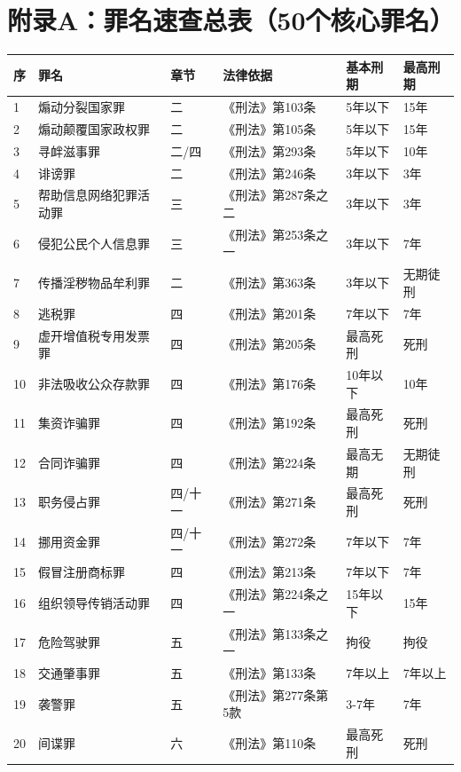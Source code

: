 \documentclass[12pt,a4paper]{article}
\begin{document}
\section{附录A：罪名速查总表（50个核心罪名）}

\begin{longtable}{p{0.5cm}p{4cm}p{2cm}p{3cm}p{2cm}p{2cm}}
  \toprule
  \textbf{序} & \textbf{罪名} & \textbf{章节} & \textbf{法律依据} & \textbf{基本刑期} & \textbf{最高刑期} \\
  \midrule
  1 & 煽动分裂国家罪 & 二 & 《刑法》第103条 & 5年以下 & 15年 \\
  2 & 煽动颠覆国家政权罪 & 二 & 《刑法》第105条 & 5年以下 & 15年 \\
  3 & 寻衅滋事罪 & 二/四 & 《刑法》第293条 & 5年以下 & 10年 \\
  4 & 诽谤罪 & 二 & 《刑法》第246条 & 3年以下 & 3年 \\
  5 & 帮助信息网络犯罪活动罪 & 三 & 《刑法》第287条之二 & 3年以下 & 3年 \\
  6 & 侵犯公民个人信息罪 & 三 & 《刑法》第253条之一 & 3年以下 & 7年 \\
  7 & 传播淫秽物品牟利罪 & 二 & 《刑法》第363条 & 3年以下 & 无期徒刑 \\
  8 & 逃税罪 & 四 & 《刑法》第201条 & 7年以下 & 7年 \\
  9 & 虚开增值税专用发票罪 & 四 & 《刑法》第205条 & 最高死刑 & 死刑 \\
  10 & 非法吸收公众存款罪 & 四 & 《刑法》第176条 & 10年以下 & 10年 \\
  11 & 集资诈骗罪 & 四 & 《刑法》第192条 & 最高死刑 & 死刑 \\
  12 & 合同诈骗罪 & 四 & 《刑法》第224条 & 最高无期 & 无期徒刑 \\
  13 & 职务侵占罪 & 四/十一 & 《刑法》第271条 & 最高死刑 & 死刑 \\
  14 & 挪用资金罪 & 四/十一 & 《刑法》第272条 & 7年以下 & 7年 \\
  15 & 假冒注册商标罪 & 四 & 《刑法》第213条 & 7年以下 & 7年 \\
  16 & 组织领导传销活动罪 & 四 & 《刑法》第224条之一 & 15年以下 & 15年 \\
  17 & 危险驾驶罪 & 五 & 《刑法》第133条之一 & 拘役 & 拘役 \\
  18 & 交通肇事罪 & 五 & 《刑法》第133条 & 7年以上 & 7年以上 \\
  19 & 袭警罪 & 五 & 《刑法》第277条第5款 & 3-7年 & 7年 \\
  20 & 间谍罪 & 六 & 《刑法》第110条 & 最高死刑 & 死刑 \\

\end{longtable}
\end{document}
